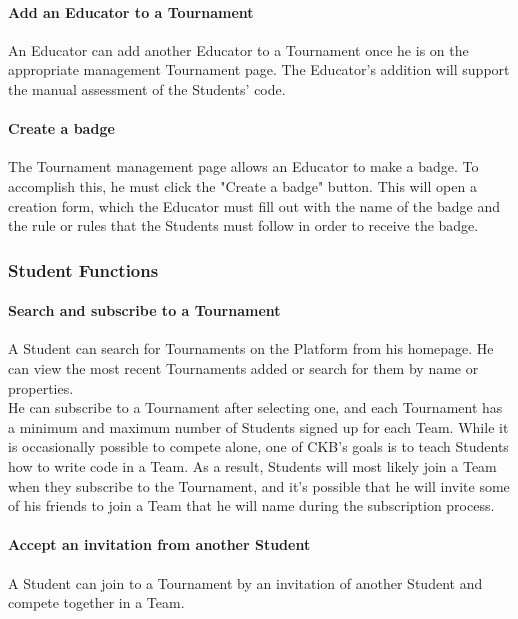\paragraph{Add an Educator to a Tournament}
An Educator can add another Educator to a Tournament once he is on the appropriate management Tournament page. The Educator's addition will support the manual assessment of the Students' code.
\paragraph{Create a badge}
The Tournament management page allows an Educator to make a badge. To accomplish this, he must click the "Create a badge" button. This will open a creation form, which the Educator must fill out with the name of the badge and the rule 
or rules that the Students must follow in order to receive the badge.

\subsubsection{Student Functions}
\paragraph{Search and subscribe to a Tournament}
A Student can search for Tournaments on the Platform from his homepage. He can view the most recent Tournaments added or search for them by name or properties.\\
He can subscribe to a Tournament after selecting one, and each Tournament has a minimum and maximum number of Students signed up for each Team. While it is occasionally possible to compete alone, one of CKB's goals is to teach 
Students how to write code in a Team. As a result, Students will most likely join a Team when they subscribe to the Tournament, and it's possible that he will invite some of his friends to join a Team that he will name during the 
subscription process.
\paragraph{Accept an invitation from another Student}
A Student can join to a Tournament by an invitation of another Student and compete together in a Team.
